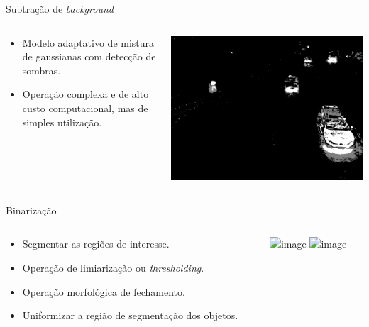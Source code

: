 \begin{frame}{Subtração de \textit{background}}
  \begin{columns}[T]
    \begin{column}{.5\textwidth}
      \begin{itemize}
        \item Modelo adaptativo de mistura de gaussianas com detecção de sombras.
        \item Operação complexa e de alto custo computacional, mas de simples utilização.
      \end{itemize}
    \end{column}
    \begin{column}{.5\textwidth}
      \begin{block}{}
        \includegraphics[width=\textwidth]{imgs/foreground.png}
      \end{block}
    \end{column}
  \end{columns}
\end{frame}

\begin{frame}{Binarização}
  \begin{columns}[T]
    \begin{column}{.5\textwidth}
      \begin{itemize}
        \item<1-> Segmentar as regiões de interesse.
        \item<1-> Operação de limiarização ou \textit{thresholding}.
        \item<2-> Operação morfológica de fechamento.
        \item<2-> Uniformizar a região de segmentação dos objetos.
      \end{itemize}
    \end{column}
    \begin{column}{.5\textwidth}
      \begin{block}{}
        \includegraphics<1>[width=\textwidth]{imgs/bin.png}
        \includegraphics<2>[width=\textwidth]{imgs/morph.png}
      \end{block}
    \end{column}
  \end{columns}
\end{frame}

